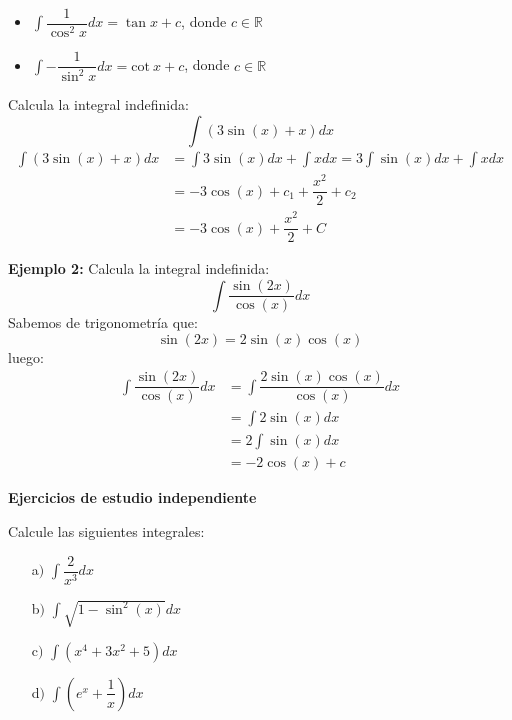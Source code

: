 \documentclass[xcolor=table, t]{beamer}
\begin{document}
	\begin{frame}
		\begin{block}{}
			\begin{itemize}[<+->]
				\item $\displaystyle \int\dfrac{1}{\cos^2 x}dx=\tan x+c$, donde $c\in\mathbb{R}$
				\item $\displaystyle \int-\dfrac{1}{\sin^2 x}dx=\text{cot}\ x+c$, donde $c\in\mathbb{R}$
			\end{itemize}
		\end{block}
		 Calcula la integral indefinida:
			$$\displaystyle \int (3\sin(x)+x)dx$$
			\pause[4]
			\begin{align*}
				\int (3\sin(x)+x)dx&=\int 3\sin(x)dx+\int xdx=3\int\sin(x)dx+\int xdx\\
				&=-3\cos(x)+c_1+\dfrac{x^2}{2}+c_2\\
				&=-3\cos(x)+\dfrac{x^2}{2}+C
			\end{align*}
	\end{frame}
	\begin{frame}
		{\bf Ejemplo 2:} Calcula la integral indefinida:
		$$\displaystyle \int \dfrac{\sin(2x)}{\cos(x)}dx$$
		\pause
		Sabemos de trigonometría que:
		$$\sin(2x)=2\sin(x)\cos(x)$$
		luego:
		\begin{align*}
			\int \dfrac{\sin(2x)}{\cos(x)}dx&=\int\dfrac{2\sin(x)\cos(x)}{\cos(x)}dx\\
			&=\int2\sin(x)dx\\
			&=2\int\sin(x)dx\\
			&=-2\cos(x)+c
		\end{align*}
	\end{frame}
	\begin{frame}
		{\bf Ejercicios de estudio independiente}
		\begin{center}
			Calcule las siguientes integrales:
			\begin{enumerate}
				\item[a$)$] $\displaystyle \int\dfrac{2}{x^3}dx$
				\item[b$)$] $\displaystyle \int\sqrt{1-\sin^2(x)}dx$
				\item[c$)$] $\displaystyle \int (x^4+3x^2+5)dx$
				\item[d$)$] $\displaystyle \int \left(e^x+\dfrac{1}{x}\right)dx$
			\end{enumerate}
		\end{center}
	\end{frame}
\end{document}
